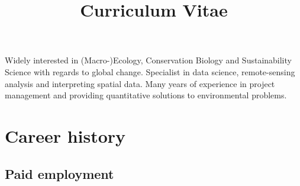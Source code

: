 \documentclass[12pt,a4paper,serif]{moderncv}        %
\title{Curriculum Vitae}                               %
\begin{document}
\makecvtitle

\small{Widely interested in (Macro-)Ecology, Conservation Biology and Sustainability Science with regards to global change. Specialist in data science, remote-sensing analysis and interpreting spatial data. Many years of experience in project management and providing quantitative solutions to environmental problems.}

\section{Career history}
\subsection{Paid employment}
\vspace{4pt}
\end{document}
